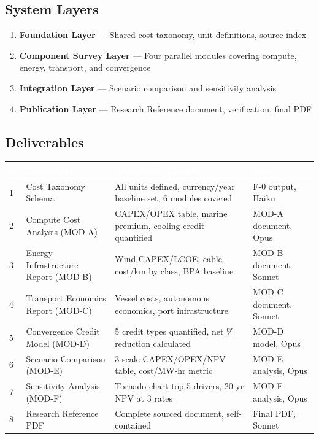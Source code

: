 \documentclass[11pt,letterpaper]{article}
\newcommand{\tableheader}[1]{\textbf{\sffamily\textcolor{white}{#1}}}
\begin{document}
\subsection{System Layers}
\begin{enumerate}
  \item \textbf{Foundation Layer} --- Shared cost taxonomy, unit definitions, source index
  \item \textbf{Component Survey Layer} --- Four parallel modules covering compute, energy, transport, and convergence
  \item \textbf{Integration Layer} --- Scenario comparison and sensitivity analysis
  \item \textbf{Publication Layer} --- Research Reference document, verification, final PDF
\end{enumerate}

\subsection{Deliverables}

\begin{center}
\begin{tabularx}{\textwidth}{C{0.5cm}L{4.5cm}L{4cm}L{4cm}}
\toprule
{}
\tableheader{\#} & \tableheader{Deliverable} & \tableheader{Acceptance Criteria} & \tableheader{Spec} \\
 & Cost Taxonomy Schema & All units defined, currency/year baseline set, 6 modules covered & F-0 output, Haiku \\
2 & Compute Cost Analysis (MOD-A) & CAPEX/OPEX table, marine premium, cooling credit quantified & MOD-A document, Opus \\
3 & Energy Infrastructure Report (MOD-B) & Wind CAPEX/LCOE, cable cost/km by class, BPA baseline & MOD-B document, Sonnet \\
4 & Transport Economics Report (MOD-C) & Vessel costs, autonomous economics, port infrastructure & MOD-C document, Sonnet \\
5 & Convergence Credit Model (MOD-D) & 5 credit types quantified, net \% reduction calculated & MOD-D model, Opus \\
6 & Scenario Comparison (MOD-E) & 3-scale CAPEX/OPEX/NPV table, cost/MW-hr metric & MOD-E analysis, Opus \\
7 & Sensitivity Analysis (MOD-F) & Tornado chart top-5 drivers, 20-yr NPV at 3 rates & MOD-F analysis, Opus \\
8 & Research Reference PDF & Complete sourced document, self-contained & Final PDF, Sonnet \\
\bottomrule
\end{tabularx}
\end{center}
\end{document}
